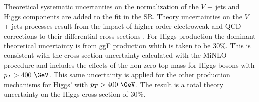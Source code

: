 Theoretical systematic uncertanties on the normalization of the $V$ + jets and
Higgs components are added to the fit in the SR.  Theory uncertainties on the
$V$ + jets processes result from the impact of higher order electroweak and QCD
corrections to their differential cross sections \cite{Lindert:2017olm}. For
Higgs production the dominant theoretical uncertainty is from ggF production
which is taken to be $30\%$.  This is consistent with the cross section
uncertainty calculated with the MiNLO procedure and includes the effects of the
non-zero top-mass for Higgs bosons with $p_{T} > 400~\GeV$.  This same
uncertainty is applied for the other production mechanisms for Higgs' with
$p_{T} > 400~\GeV$.  The result is a total theory uncertainty on the Higgs
cross section of $30\%$.
